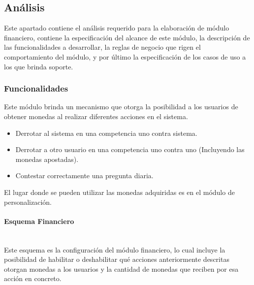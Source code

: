 
\subsection{Análisis}

 Este apartado contiene el análisis requerido para la elaboración de módulo financiero,
 contiene la especificación del alcance de este módulo, la descripción de las funcionalidades
 a desarrollar, la reglas de negocio que rigen el comportamiento del módulo, y por último la
 especificación de los casos de uso a los que brinda soporte.

\subsubsection{Funcionalidades}


 \noindent
 Este módulo brinda un mecanismo que otorga la posibilidad a los usuarios de
 obtener monedas al realizar diferentes acciones en el sistema.
 \begin{itemize}
   \item Derrotar al sistema en una competencia uno contra sistema.
   \item Derrotar a otro usuario en una competencia uno contra uno (Incluyendo las monedas apostadas).
   \item Contestar correctamente una pregunta diaria.
 \end{itemize}
   \noindent El lugar donde se pueden utilizar las monedas adquiridas es en el módulo de personalización.
 \paragraph{Esquema Financiero}\mbox{}\\
 Este esquema es la configuración del módulo financiero, lo cual incluye la posibilidad de habilitar o deshabilitar qué acciones anteriormente descritas
  otorgan monedas a los usuarios y la cantidad de monedas que reciben por esa acción en concreto.
%

